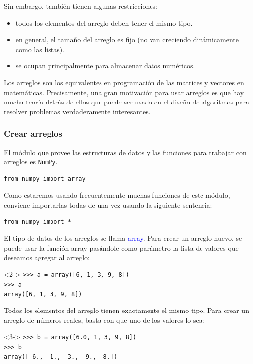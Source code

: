 \begin{frame}
Sin embargo, también tienen algunas restricciones:
\begin{itemize}
\item todos los elementos del arreglo deben tener el mismo tipo.
\item en general, el tamaño del arreglo es fijo (no van creciendo dinámicamente como las listas).
\item se ocupan principalmente para almacenar datos numéricos.
\end{itemize}
\end{frame}
\begin{frame}
Los arreglos son los equivalentes en programación de las matrices y vectores en matemáticas. Precisamente, una gran motivación para usar arreglos es que hay mucha teoría detrás de ellos que puede ser usada en el diseño de algoritmos para resolver problemas verdaderamente interesantes.
\end{frame}
\begin{frame}[fragile]
\frametitle{Crear arreglos}
El módulo que provee las estructuras de datos y las funciones para trabajar con arreglos es \texttt{NumPy}.
\begin{verbatim}
from numpy import array
\end{verbatim}
Como estaremos usando frecuentemente muchas funciones de este módulo, conviene importarlas todas de una vez usando la siguiente sentencia:
\begin{verbatim}
from numpy import *
\end{verbatim}
\end{frame}
\begin{frame}[fragile]
El tipo de datos de los arreglos se llama \textcolor{blue}{array}. Para crear un arreglo nuevo, se puede usar la función array pasándole como parámetro la lista de valores que deseamos agregar al arreglo:
\begin{exampleblock}{}<2->
\pause
\verb|>>> a = array([6, 1, 3, 9, 8])| \\
\pause
\verb|>>> a|  \\
\pause
\verb|array([6, 1, 3, 9, 8])|
\end{exampleblock}
\pause
Todos los elementos del arreglo tienen exactamente el mismo tipo. Para crear un arreglo de números reales, basta con que uno de los valores lo sea:
\pause
\begin{exampleblock}{}<3->
\pause
\verb|>>> b = array([6.0, 1, 3, 9, 8])| \\
\pause
\verb|>>> b| \\
\pause
\verb|array([ 6.,  1.,  3.,  9.,  8.])| 
\end{exampleblock}
\end{frame}
